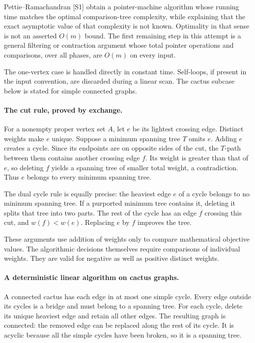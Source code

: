 \documentclass[11pt]{article}
\begin{document}
Pettie--Ramachandran [S1] obtain a pointer-machine algorithm whose running time matches the optimal comparison-tree complexity, while explaining that the exact asymptotic value of that complexity is not known. Optimality in that sense is not an asserted $O(m)$ bound. The first remaining step in this attempt is a general filtering or contraction argument whose total pointer operations and comparisons, over all phases, are $O(m)$ on every input.

The one-vertex case is handled directly in constant time. Self-loops, if present in the input convention, are discarded during a linear scan. The cactus subcase below is stated for simple connected graphs.

\paragraph{The cut rule, proved by exchange.}
For a nonempty proper vertex set $A$, let $e$ be its lightest crossing edge. Distinct weights make $e$ unique. Suppose a minimum spanning tree $T$ omits $e$. Adding $e$ creates a cycle. Since its endpoints are on opposite sides of the cut, the $T$-path between them contains another crossing edge $f$. Its weight is greater than that of $e$, so deleting $f$ yields a spanning tree of smaller total weight, a contradiction. Thus $e$ belongs to every minimum spanning tree.

The dual cycle rule is equally precise: the heaviest edge $e$ of a cycle belongs to no minimum spanning tree. If a purported minimum tree contains it, deleting it splits that tree into two parts. The rest of the cycle has an edge $f$ crossing this cut, and $w(f)<w(e)$. Replacing $e$ by $f$ improves the tree.

These arguments use addition of weights only to compare mathematical objective values. The algorithmic decisions themselves require comparisons of individual weights. They are valid for negative as well as positive distinct weights.

\paragraph{A deterministic linear algorithm on cactus graphs.}
A connected cactus has each edge in at most one simple cycle. Every edge outside its cycles is a bridge and must belong to a spanning tree. For each cycle, delete its unique heaviest edge and retain all other edges. The resulting graph is connected: the removed edge can be replaced along the rest of its cycle. It is acyclic because all the simple cycles have been broken, so it is a spanning tree.
\end{document}
